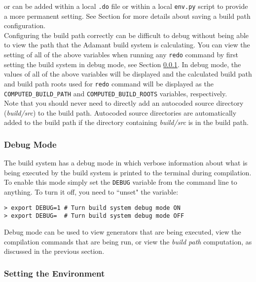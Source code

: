 or can be added within a local \texttt{.do} file or within a local \texttt{env.py} script to provide a more permanent setting. See Section \label{Setting the Environment} for more details about saving a build path configuration. \\

Configuring the build path correctly can be difficult to debug without being able to view the path that the Adamant build system is calculating. You can view the setting of all of the above variables when running any \texttt{redo} command by first setting the build system in debug mode, see Section \ref{Debug Mode}. In debug mode, the values of all of the above variables will be displayed and the calculated build path and build path roots used for \texttt{redo} command will be displayed as the \texttt{COMPUTED\_BUILD\_PATH} and \texttt{COMPUTED\_BUILD\_ROOTS} variables, respectively. \\

Note that you should never need to directly add an autocoded source directory (\textit{build/src}) to the build path. Autocoded source directories are automatically added to the build path if the directory containing \textit{build/src} is in the build path.

\subsubsection{Debug Mode} \label{Debug Mode}

The build system has a debug mode in which verbose information about what is being executed by the build system is printed to the terminal during compilation. To enable this mode simply set the \texttt{DEBUG} variable from the command line to anything. To turn it off, you need to ``unset" the variable:

\vspace{5mm} %
\begin{verbatim}
> export DEBUG=1 # Turn build system debug mode ON
> export DEBUG=  # Turn build system debug mode OFF
\end{verbatim}
\vspace{5mm} %

Debug mode can be used to view generators that are being executed, view the compilation commands that are being run, or view the \textit{build path} computation, as discussed in the previous section.

\subsubsection{Setting the Environment} \label{Setting the Environment}

